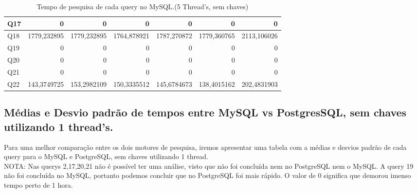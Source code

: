 \documentclass{article}
\begin{document}
\begin{table}[H]
{\begin{tabular}{|l|r|r|r|r|r|r|}
        Q17	&0&	0	&0	&0&	0&	0 \\ \hline
        Q18	&1779,232895	&1779,232895&	1764,878921&	1787,270872	&1779,360765&	2113,106026 \\ \hline
        Q19	&0&	0	&0	&0&	0&	0 \\ \hline
        Q20	&0&	0	&0	&0&	0&	0 \\ \hline
        Q21	&0&	0	&0	&0&	0&	0 \\ \hline
        Q22	&143,3749725&	153,2982109	&150,3335512	&145,6784673&	138,4015162&	202,4831903 \\ \hline \end{tabular}}
    \caption{Tempo de pesquisa de cada query no MySQL.(5 Thread's, sem chaves)}
    \label{tab:BC_Table3}
  \end{table}


\clearpage
\subsection{Médias e Desvio padrão de tempos entre MySQL vs PostgresSQL, sem chaves utilizando 1 thread's.}

  \quad Para uma melhor comparação entre os dois motores de pesquisa, iremos apresentar uma tabela com a médias e desvios padrão de cada query para o MySQL e PostgreSQL, sem chaves utilizando 1 thread. \\
NOTA: Nas querys 2,17,20,21 não é possível ter uma análise, visto que não foi concluída nem no PostgreSQL nem o MySQL. A query 19 não foi concluída no MySQL, portanto podemos concluir que no PostgreSQL foi mais rápido. O valor de 0 significa que demorou imenso tempo perto de 1 hora.
\end{document}
